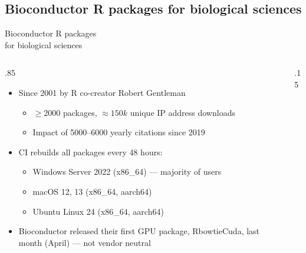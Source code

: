 \documentclass[
aspectratio=169,
xcolor={usenames}
]{beamer}
\begin{document}
\subsection{Bioconductor R packages for biological sciences}
\begin{frame}{\hspace{8cm}Bioconductor R packages\\%
    \hspace{8cm}for biological sciences}
  \begin{columns}[T]
    \begin{column}{.85\framewidth}
      \begin{itemize}[<+->]
      \item Since 2001 by R co-creator Robert Gentleman
        \begin{itemize}[<.->]
        \item $\ge 2000$ packages, %
          $\approx 150k$ unique IP address downloads\footnotemark[1]
        \item Impact of 5000--6000 yearly citations since 2019\footnotemark[1]
        \end{itemize}
      \item CI rebuilds all packages every 48 hours:
        \begin{itemize}[<.->]
        \item Windows Server 2022 (x86\_64) --- majority of users
        \item macOS 12, 13 (x86\_64, aarch64)
        \item Ubuntu Linux 24 (x86\_64, aarch64)
        \end{itemize}
      \item Bioconductor released their first GPU package, RbowtieCuda, %
        last month (April) --- not vendor neutral
      \end{itemize}
    \end{column}
    \begin{column}{.15\framewidth}
\end{column}
\end{columns}
\end{frame}
\end{document}
